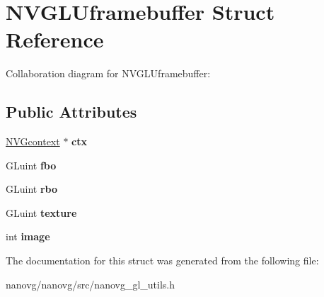 \hypertarget{struct_n_v_g_l_uframebuffer}{\section{N\+V\+G\+L\+Uframebuffer Struct Reference}
\label{struct_n_v_g_l_uframebuffer}
}


Collaboration diagram for N\+V\+G\+L\+Uframebuffer\+:
\subsection*{Public Attributes}
\begin{DoxyCompactItemize}
\item 
\hypertarget{struct_n_v_g_l_uframebuffer_aa2534a35549b80066ddb0074429bdeb9}{\hyperlink{struct_n_v_gcontext}{N\+V\+Gcontext} $\ast$ {\bfseries ctx}}\label{struct_n_v_g_l_uframebuffer_aa2534a35549b80066ddb0074429bdeb9}

\item 
\hypertarget{struct_n_v_g_l_uframebuffer_a4886c573b613662fa641a3720dc44a3d}{G\+Luint {\bfseries fbo}}\label{struct_n_v_g_l_uframebuffer_a4886c573b613662fa641a3720dc44a3d}

\item 
\hypertarget{struct_n_v_g_l_uframebuffer_a4e818cdb5b53131f30d435f5e555b238}{G\+Luint {\bfseries rbo}}\label{struct_n_v_g_l_uframebuffer_a4e818cdb5b53131f30d435f5e555b238}

\item 
\hypertarget{struct_n_v_g_l_uframebuffer_aa3d346c5f6d954467dfc6d875d3bd250}{G\+Luint {\bfseries texture}}\label{struct_n_v_g_l_uframebuffer_aa3d346c5f6d954467dfc6d875d3bd250}

\item 
\hypertarget{struct_n_v_g_l_uframebuffer_a9aa2647087ebe9264084eb0392c17045}{int {\bfseries image}}\label{struct_n_v_g_l_uframebuffer_a9aa2647087ebe9264084eb0392c17045}

\end{DoxyCompactItemize}


The documentation for this struct was generated from the following file\+:\begin{DoxyCompactItemize}
\item 
nanovg/nanovg/src/nanovg\+\_\+gl\+\_\+utils.\+h\end{DoxyCompactItemize}
